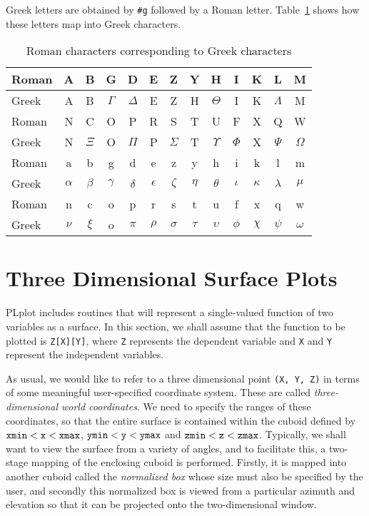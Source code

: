 Greek letters are obtained by \verb+#g+ followed by a Roman letter.
Table~\ref{greek} shows how these letters map into Greek characters.
\begin{table}
   \centering
   \begin{tabular}{|l|*{12}{c|}}
   \hline
   Roman&A&B&G&D&E&Z&Y&H&I&K&L&M\\
   \hline
   Greek&A & B & $\Gamma$ & $\Delta$ & E & Z & H & $\Theta$ & I & K &
   $\Lambda$ & M \\
   \hline\hline
   Roman&N&C&O&P&R&S&T&U&F&X&Q&W\\
   \hline
   Greek&N & $\Xi$ & O & $\Pi$ & P & $\Sigma$ &
   T & $\Upsilon$ & $\Phi$ & X & $\Psi$ & $\Omega$ \\
   \hline\hline
   Roman&a&b&g&d&e&z&y&h&i&k&l&m\\
   \hline
   Greek&   $\alpha$ & $\beta$ & $\gamma$ & $\delta$ & $\epsilon$ & $\zeta$ &
   $\eta$ & $\theta$ & $\iota$ & $\kappa$ &
   $\lambda$ & $\mu$ \\
   \hline\hline
   Roman&n&c&o&p&r&s&t&u&f&x&q&w\\
   \hline
   Greek& $\nu$ & $\xi$ & o & $\pi$ & $\rho$ & $\sigma$ &
   $\tau$ & $\upsilon$ & $\phi$ & $\chi$ & $\psi$ & $\omega$ \\
   \hline
   \end{tabular}
\caption{Roman characters corresponding to Greek characters}
\label{greek}
\end{table}


\section {Three Dimensional Surface Plots} \label{threed}

PLplot includes routines that will represent a single-valued function
of two variables as a surface. In this section, we shall assume that
the function to be plotted is {\tt Z[X][Y]}, where {\tt Z} represents
the dependent variable and {\tt X} and {\tt Y} represent the independent
variables.

As usual, we would like to refer to a three dimensional point {\tt (X, Y, Z)}
in terms of some meaningful user-specified coordinate system. These are
called {\em three-dimensional world coordinates}. We need to specify the
ranges of these coordinates, so that the entire surface is contained within the
cuboid defined by ${\tt xmin}<{\tt x}<{\tt xmax}$, 
${\tt ymin}<{\tt y}<{\tt ymax}$ and
${\tt zmin}<{\tt z}<{\tt zmax}$. Typically, we shall want to view the
surface from a variety of angles, and to facilitate this, a two-stage
mapping of the enclosing cuboid is performed. Firstly, it is mapped
into another cuboid called the {\em normalized box\/} whose size must also
be specified by the user, and secondly this normalized box is viewed from
a particular azimuth and elevation so that it can be projected onto the
two-dimensional window.

